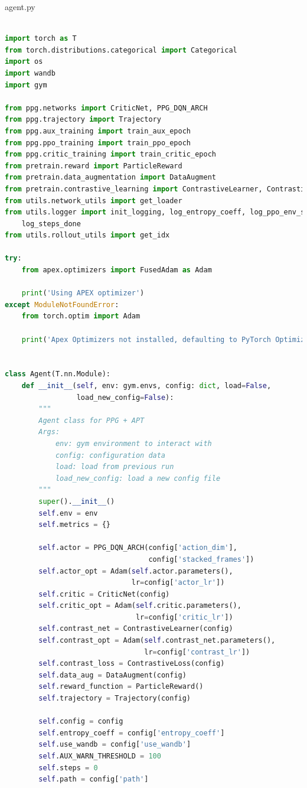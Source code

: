\documentclass{article}
\begin{document}
\newpage
agent.py
\begin{lstlisting}[language=Python]

import torch as T
from torch.distributions.categorical import Categorical
import os
import wandb
import gym

from ppg.networks import CriticNet, PPG_DQN_ARCH
from ppg.trajectory import Trajectory
from ppg.aux_training import train_aux_epoch
from ppg.ppo_training import train_ppo_epoch
from ppg.critic_training import train_critic_epoch
from pretrain.reward import ParticleReward
from pretrain.data_augmentation import DataAugment
from pretrain.contrastive_learning import ContrastiveLearner, ContrastiveLoss
from utils.network_utils import get_loader
from utils.logger import init_logging, log_entropy_coeff, log_ppo_env_steps, \
    log_steps_done
from utils.rollout_utils import get_idx

try:
    from apex.optimizers import FusedAdam as Adam

    print('Using APEX optimizer')
except ModuleNotFoundError:
    from torch.optim import Adam

    print('Apex Optimizers not installed, defaulting to PyTorch Optimizer')


class Agent(T.nn.Module):
    def __init__(self, env: gym.envs, config: dict, load=False,
                 load_new_config=False):
        """
        Agent class for PPG + APT
        Args:
            env: gym environment to interact with
            config: configuration data
            load: load from previous run
            load_new_config: load a new config file
        """
        super().__init__()
        self.env = env
        self.metrics = {}

        self.actor = PPG_DQN_ARCH(config['action_dim'],
                                  config['stacked_frames'])
        self.actor_opt = Adam(self.actor.parameters(),
                              lr=config['actor_lr'])
        self.critic = CriticNet(config)
        self.critic_opt = Adam(self.critic.parameters(),
                               lr=config['critic_lr'])
        self.contrast_net = ContrastiveLearner(config)
        self.contrast_opt = Adam(self.contrast_net.parameters(),
                                 lr=config['contrast_lr'])
        self.contrast_loss = ContrastiveLoss(config)
        self.data_aug = DataAugment(config)
        self.reward_function = ParticleReward()
        self.trajectory = Trajectory(config)

        self.config = config
        self.entropy_coeff = config['entropy_coeff']
        self.use_wandb = config['use_wandb']
        self.AUX_WARN_THRESHOLD = 100
        self.steps = 0
        self.path = config['path']


\end{lstlisting}
\end{document}
